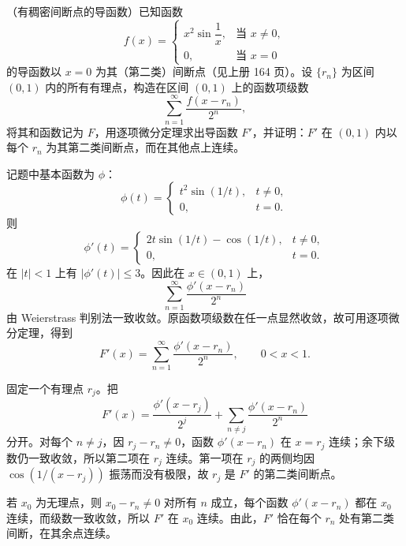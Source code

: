 \begin{xreferenceproblem}[17]
（有稠密间断点的导函数）已知函数
\[
  f(x)=
  \begin{cases}
    x^2\sin\dfrac1x,&\text{当 }x\ne0,\\
    0,&\text{当 }x=0
  \end{cases}
\]
的导函数以 $x=0$ 为其（第二类）间断点（见上册 164 页）。设 $\{r_n\}$ 为区间 $(0,1)$ 内的所有有理点，构造在区间 $(0,1)$ 上的函数项级数
\[
  \sum_{n=1}^{\infty}\frac{f(x-r_n)}{2^n},
\]
将其和函数记为 $F$，用逐项微分定理求出导函数 $F'$，并证明：$F'$ 在 $(0,1)$ 内以每个 $r_n$ 为其第二类间断点，而在其他点上连续。
\end{xreferenceproblem}
\begin{xsolution}
记题中基本函数为 $\phi$：
\[
  \phi(t)=
  \begin{cases}
    t^2\sin(1/t),&t\ne0,\\
    0,&t=0.
  \end{cases}
\]
则
\[
  \phi'(t)=
  \begin{cases}
    2t\sin(1/t)-\cos(1/t),&t\ne0,\\
    0,&t=0.
  \end{cases}
\]
在 $|t|<1$ 上有 $|\phi'(t)|\leqslant3$。因此在 $x\in(0,1)$ 上，
\[
  \sum_{n=1}^{\infty}\frac{\phi'(x-r_n)}{2^n}
\]
由 Weierstrass 判别法一致收敛。原函数项级数在任一点显然收敛，故可用逐项微分定理，得到
\[
  F'(x)=\sum_{n=1}^{\infty}\frac{\phi'(x-r_n)}{2^n},
  \qquad0<x<1.
\]

固定一个有理点 $r_j$。把
\[
  F'(x)=\frac{\phi'(x-r_j)}{2^j}
  +\sum_{n\ne j}\frac{\phi'(x-r_n)}{2^n}
\]
分开。对每个 $n\ne j$，因 $r_j-r_n\ne0$，函数 $\phi'(x-r_n)$ 在 $x=r_j$ 连续；余下级数仍一致收敛，所以第二项在 $r_j$ 连续。第一项在 $r_j$ 的两侧均因 $\cos(1/(x-r_j))$ 振荡而没有极限，故 $r_j$ 是 $F'$ 的第二类间断点。

若 $x_0$ 为无理点，则 $x_0-r_n\ne0$ 对所有 $n$ 成立，每个函数 $\phi'(x-r_n)$ 都在 $x_0$ 连续，而级数一致收敛，所以 $F'$ 在 $x_0$ 连续。由此，$F'$ 恰在每个 $r_n$ 处有第二类间断，在其余点连续。
\end{xsolution}

